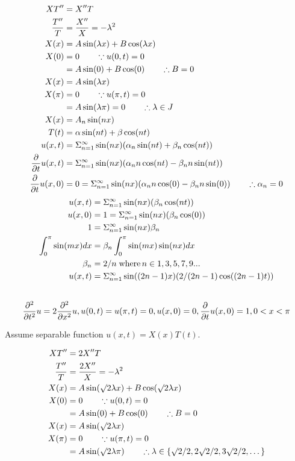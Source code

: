 \documentclass[12pt,USLetter]{article}
\begin{document}
\begin{align*}
XT^{\prime\prime} &= X^{\prime\prime} T \\
\frac{T^{\prime\prime}}{T} &= \frac{X^{\prime\prime}}{X} = -\lambda^2 \\
X(x) &= A\sin(\lambda x) + B\cos(\lambda x) \\
X(0) &= 0 \qquad \because u(0,t) = 0 \\
&= A\sin(0) + B\cos(0) \qquad \therefore B = 0 \\
X(x) &= A\sin(\lambda x) \\
X(\pi) &= 0 \qquad \because u(\pi,t) = 0 \\
&= A\sin(\lambda \pi) = 0 \qquad \therefore \lambda \in J \\
X(x) &= A_n\sin(nx) \\
T(t) &= \alpha\sin(nt) + \beta\cos(nt) \\
u(x,t) &= \Sigma_{n=1}^{\infty}\sin(nx) (\alpha_n\sin(nt) + \beta_n\cos(nt)) \\
\frac{\partial}{\partial{t}}u(x,t) &= \Sigma_{n=1}^\infty\sin(nx) (\alpha_n n\cos(nt) - \beta_n n\sin(nt)) \\
\frac{\partial}{\partial{t}}u(x,0) &= 0 = \Sigma_{n=1}^\infty\sin(nx) (\alpha_n n\cos(0) - \beta_n n\sin(0)) \qquad \therefore \alpha_n = 0
\end{align*}
\begin{align*}
u(x,t) &= \Sigma_{n=1}^{\infty}\sin(nx) (\beta_n\cos(nt)) \\
u(x,0) &= 1 = \Sigma_{n=1}^{\infty}\sin(nx) (\beta_n\cos(0)) \\
1 &= \Sigma_{n=1}^{\infty}\sin(nx)\beta_n \\
\int_0^\pi\sin(mx)dx &= \beta_n\int_0^\pi\sin(mx)\sin(nx)dx \\
\beta_n &= 2 / n \;\mathrm{where\,} n \in {1, 3, 5, 7, 9 ...} \\
u(x,t) &= \Sigma_{n=1}^{\infty}\sin((2n-1)x) (2/(2n-1)\cos((2n-1)t))
\end{align*}

\subsection{}

\begin{equation*}
\frac{\partial^2}{\partial{t}^2}u = 2\frac{\partial^2}{\partial{x}^2}u, u(0,t) = u(\pi, t) = 0, u(x,0) = 0, \frac{\partial}{\partial{t}}u(x,0) = 1, 0<x<\pi
\end{equation*}

Assume separable function $u(x,t) = X(x)T(t)$.

\begin{align*}
XT^{\prime\prime} &= 2X^{\prime\prime} T \\
\frac{T^{\prime\prime}}{T} &= \frac{2X^{\prime\prime}}{X} = -\lambda^2 \\
X(x) &= A\sin(\surd 2\lambda x) + B\cos(\surd 2\lambda x) \\
X(0) &= 0 \qquad \because u(0,t) = 0 \\
&= A\sin(0) + B\cos(0) \qquad \therefore B = 0 \\
X(x) &= A\sin(\surd 2\lambda x) \\
X(\pi) &= 0 \qquad \because u(\pi,t) = 0 \\
&= A\sin(\surd 2\lambda\pi) \qquad \therefore \lambda \in \{\surd 2/2, 2\surd 2/2, 3\surd 2/2, \dots \} \\
\end{align*}
\end{document}
